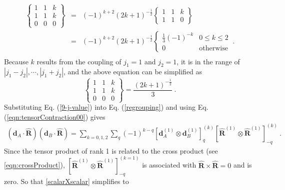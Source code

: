 \begin{eqnarray}
\left\{
\begin{array}{ccc}
1& 1&k \\
1&1&k \\
0&0&0 
\end{array}
\right\} 
&=& (-1)^{k+2} (2k+1)^{-\frac{1}{2}}
\left\{
\begin{array}{ccc}
1& 1&k \\
1&1&0 
\end{array}
\right\} \nonumber \\
&=& (-1)^{k+2} (2k+1)^{-\frac{1}{2}} 
\left\{ 
\begin{array}{cc}
\frac{1}{3} (-1)^{-k} & 0\leq k \leq 2 \\
0 & \mbox{otherwise}
\end{array}
\right. \ . \nonumber \\
\end{eqnarray}
Because $k$ results from the coupling of $j_{1}=1$ and $j_{2}=1$, it is in the range of $|j_{1}-j_{2}|, \cdots, |j_{1}+j_{2}|$, and the above equation can be simplified as
\begin{equation}
\left\{
\begin{array}{ccc}
1& 1&k \\
1&1&k \\
0&0&0 
\end{array}
\right\} = \frac{(2k + 1)^{-\frac{1}{2}}}{3} \ . \label{9-j-value}
\end{equation}  
Substituting Eq. (\ref{9-j-value}) into Eq. (\ref{regrouping}) and using Eq. (\ref{eqn:tensorContraction00}) gives
\begin{eqnarray}
(\mathbf{d}_{A}\cdot\mathbf{\hat{R} })(\mathbf{d}_{B}\cdot  \mathbf{\hat{R} })
= \sum_{k=0,1,2}\sum_{q} (-1)^{k-q} \left[ \mathbf{d}_{A}^{(1)} \otimes \mathbf{d}_{B}^{(1)} \right]^{(k)}_{q} \left[ \mathbf{\hat{R}}^{(1)} \otimes \mathbf{\hat{R}}^{(1)} \right]^{(k)}_{-q} \ . \label{scalarXscalar}
\end{eqnarray}
Since the tensor product of rank 1 is related to the cross product (see \autoref{eqn:crossProduct}), $\left[ \mathbf{\hat{R}}^{(1)} \otimes \mathbf{\hat{R}}^{(1)} \right]^{(k=1)}_{-q}$ is associated with $\mathbf{\hat{R}}\times\mathbf{\hat{R}}=0$ and is zero. So that \autoref{scalarXscalar} simplifies to 
